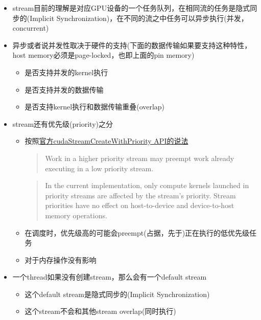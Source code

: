 \begin{itemize}
\item
  stream目前的理解是对应GPU设备的一个任务队列，在相同流的任务是隐式同步的(Implicit
  Synchronization)，在不同的流之中任务可以异步执行(并发，concurrent)
\item
  异步或者说并发性取决于硬件的支持(下面的数据传输如果要支持这种特性，host
  memory必须是page-locked，也即上面的pin memory)

  \begin{itemize}
  \tightlist
  \item
    是否支持并发的kernel执行
  \item
    是否支持并发的数据传输
  \item
    是否支持kernel执行和数据传输重叠(overlap)
  \end{itemize}
\item
  stream还有优先级(priority)之分

  \begin{itemize}
  \item
    按照\href{https://docs.nvidia.com/cuda/cuda-runtime-api/group__CUDART__STREAM.html\#group__CUDART__STREAM_1ge2be9e9858849bf62ba4a8b66d1c3540}{官方cudaStreamCreateWithPriority
    API的说法}

    \begin{quote}
    Work in a higher priority stream may preempt work already executing
    in a low priority stream.
    \end{quote}

    \begin{quote}
    In the current implementation, only compute kernels launched in
    priority streams are affected by the stream's priority. Stream
    priorities have no effect on host-to-device and device-to-host
    memory operations.
    \end{quote}
  \item
    在调度时，优先级高的可能会preempt(占据，先于)正在执行的低优先级任务
  \item
    对于内存操作没有影响
  \end{itemize}
\item
  一个thread如果没有创建stream，那么会有一个default stream

  \begin{itemize}
  \tightlist
  \item
    这个default stream是隐式同步的(Implicit Synchronization)
  \item
    这个stream不会和其他stream overlap(同时执行)
  \end{itemize}
\end{itemize}

